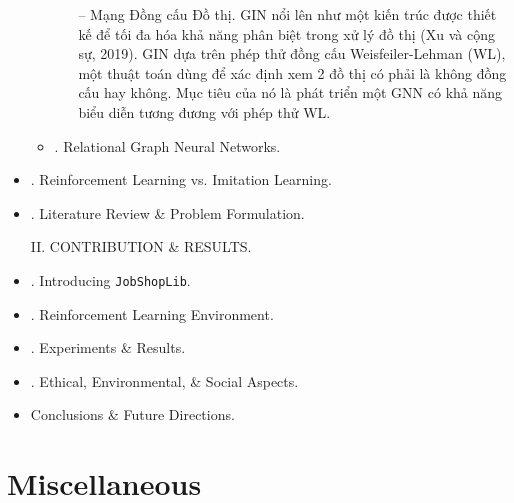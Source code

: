 \documentclass{article}
\begin{document}
\begin{itemize}
\begin{itemize}
\begin{itemize}
            -- {\sf Mạng Đồng cấu Đồ thị.} GIN nổi lên như một kiến trúc được thiết kế để tối đa hóa khả năng phân biệt trong xử lý đồ thị (Xu và cộng sự, 2019). GIN dựa trên phép thử đồng cấu Weisfeiler-Lehman (WL), một thuật toán dùng để xác định xem 2 đồ thị có phải là không đồng cấu hay không. Mục tiêu của nó là phát triển một GNN có khả năng biểu diễn tương đương với phép thử WL.
        \end{itemize}
        \item {. Relational Graph Neural Networks.}
    \end{itemize}
    \item {. Reinforcement Learning vs. Imitation Learning.}
    \item {. Literature Review \& Problem Formulation.}

    II. CONTRIBUTION \& RESULTS.
    \item {. Introducing {\tt JobShopLib}.}
    \item {. Reinforcement Learning Environment.}
    \item {. Experiments \& Results.}
    \item {. Ethical, Environmental, \& Social Aspects.}
    \item {\sf Conclusions \& Future Directions.}

\end{itemize}



\section{Miscellaneous}


\printbibliography[heading=bibintoc]
\end{document}
